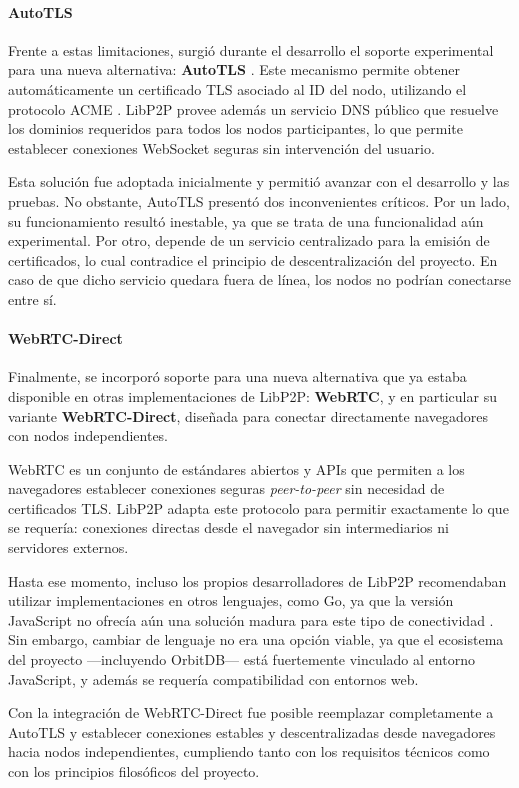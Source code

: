 \paragraph{AutoTLS}

Frente a estas limitaciones, surgió durante el desarrollo el soporte experimental para una nueva alternativa: \textbf{AutoTLS} \cite{autotls}. Este mecanismo permite obtener automáticamente un certificado TLS asociado al ID del nodo, utilizando el protocolo ACME \cite{acme}. LibP2P provee además un servicio DNS público que resuelve los dominios requeridos para todos los nodos participantes, lo que permite establecer conexiones WebSocket seguras sin intervención del usuario.

Esta solución fue adoptada inicialmente y permitió avanzar con el desarrollo y las pruebas. No obstante, AutoTLS presentó dos inconvenientes críticos. Por un lado, su funcionamiento resultó inestable, ya que se trata de una funcionalidad aún experimental. Por otro, depende de un servicio centralizado para la emisión de certificados, lo cual contradice el principio de descentralización del proyecto. En caso de que dicho servicio quedara fuera de línea, los nodos no podrían conectarse entre sí.

\paragraph{WebRTC-Direct}

Finalmente, se incorporó soporte para una nueva alternativa que ya estaba disponible en otras implementaciones de LibP2P: \textbf{WebRTC}, y en particular su variante \textbf{WebRTC-Direct}, diseñada para conectar directamente navegadores con nodos independientes.

WebRTC es un conjunto de estándares abiertos y APIs que permiten a los navegadores establecer conexiones seguras \textit{peer-to-peer} sin necesidad de certificados TLS. LibP2P adapta este protocolo para permitir exactamente lo que se requería: conexiones directas desde el navegador sin intermediarios ni servidores externos.

Hasta ese momento, incluso los propios desarrolladores de LibP2P recomendaban utilizar implementaciones en otros lenguajes, como Go, ya que la versión JavaScript no ofrecía aún una solución madura para este tipo de conectividad \cite{differences-nodejs-browser}. Sin embargo, cambiar de lenguaje no era una opción viable, ya que el ecosistema del proyecto —incluyendo OrbitDB— está fuertemente vinculado al entorno JavaScript, y además se requería compatibilidad con entornos web.

Con la integración de WebRTC-Direct fue posible reemplazar completamente a AutoTLS y establecer conexiones estables y descentralizadas desde navegadores hacia nodos independientes, cumpliendo tanto con los requisitos técnicos como con los principios filosóficos del proyecto.
